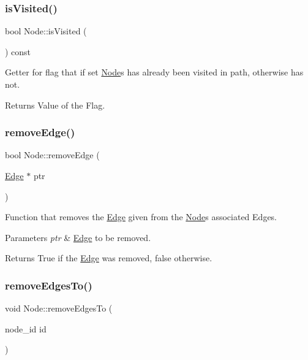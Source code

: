 \subsubsection{\texorpdfstring{is\+Visited()}{isVisited()}}
{\footnotesize\ttfamily bool Node\+::is\+Visited (\begin{DoxyParamCaption}{ }\end{DoxyParamCaption}) const}

Getter for flag that if set \hyperlink{class_node}{Node}\textquotesingle{}s has already been visited in path, otherwise has not.

\begin{DoxyReturn}{Returns}
Value of the Flag. 
\end{DoxyReturn}
\hypertarget{class_node_a4c78d9813537ccfc829401f979176428}{}\label{class_node_a4c78d9813537ccfc829401f979176428} 
\subsubsection{\texorpdfstring{remove\+Edge()}{removeEdge()}}
{\footnotesize\ttfamily bool Node\+::remove\+Edge (\begin{DoxyParamCaption}\item[{\hyperlink{class_edge}{Edge} $\ast$}]{ptr }\end{DoxyParamCaption})}

Function that removes the \hyperlink{class_edge}{Edge} given from the \hyperlink{class_node}{Node}\textquotesingle{}s associated Edges.


\begin{DoxyParams}{Parameters}
{\em ptr} & \hyperlink{class_edge}{Edge} to be removed.\\
\hline
\end{DoxyParams}
\begin{DoxyReturn}{Returns}
True if the \hyperlink{class_edge}{Edge} was removed, false otherwise. 
\end{DoxyReturn}
\hypertarget{class_node_a70d6617e33b3fc219f9d3c1bd48d7cca}{}\label{class_node_a70d6617e33b3fc219f9d3c1bd48d7cca} 
\subsubsection{\texorpdfstring{remove\+Edges\+To()}{removeEdgesTo()}}
{\footnotesize\ttfamily void Node\+::remove\+Edges\+To (\begin{DoxyParamCaption}\item[{node\+\_\+id}]{id }\end{DoxyParamCaption})}

